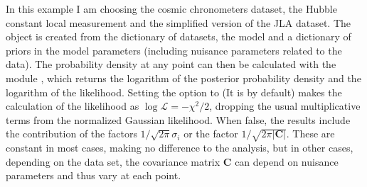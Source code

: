\documentclass[letterpaper,12pt,english]{sphinxhowto}
\begin{document}
\begin{sphinxVerbatim}[commandchars=\\\{\}]
  
      \PYG{p}{[} \PYG{p}{]}
      \PYG{p}{[} \PYG{p}{]}
      \PYG{p}{[} \PYG{p}{]}
    
      
\end{sphinxVerbatim}

In this example I am choosing the cosmic chronometers dataset, the Hubble constant local measurement and the simplified version of the JLA dataset.
The  object is created from the dictionary of datasets, the model
and a dictionary of priors in the model parameters (including nuisance
parameters related to the data).
The probability density at any point can then be calculated with the module
, which returns the logarithm of the posterior probability
density and the logarithm of the likelihood.
Setting the option  to  (It is  by default) makes the
calculation of the likelihood as \(\log \mathcal{L} = - \chi^2/2\),
dropping the usual multiplicative terms from the normalized Gaussian likelihood.
When false, the results include the contribution of the factors
\(1/\sqrt{2\pi} \sigma_i\) or the factor \(1/\sqrt{2 \pi |\textbf{C}|}\).
These are constant in most cases, making no difference to the analysis,
but in other cases, depending on the data set, the covariance matrix
\(\textbf{C}\) can depend on nuisance parameters and thus vary at each
point.
\end{document}
